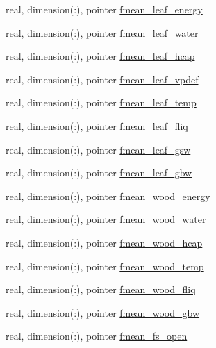 \begin{DoxyCompactItemize}
\item 
real, dimension(\+:), pointer \hyperlink{structed__state__vars_1_1edtype_a86d023e0719e25759958624fc4deab6a}{fmean\+\_\+leaf\+\_\+energy}
\item 
real, dimension(\+:), pointer \hyperlink{structed__state__vars_1_1edtype_ad010ecca9434d7086e8dcfbdaa4d3a26}{fmean\+\_\+leaf\+\_\+water}
\item 
real, dimension(\+:), pointer \hyperlink{structed__state__vars_1_1edtype_a08d40b6cd3d1b739b2ab23fb80eebb4b}{fmean\+\_\+leaf\+\_\+hcap}
\item 
real, dimension(\+:), pointer \hyperlink{structed__state__vars_1_1edtype_aa32570775165fe8ca61547c18eb6f1c7}{fmean\+\_\+leaf\+\_\+vpdef}
\item 
real, dimension(\+:), pointer \hyperlink{structed__state__vars_1_1edtype_a6879b6513cc08a7d32407853019ce04b}{fmean\+\_\+leaf\+\_\+temp}
\item 
real, dimension(\+:), pointer \hyperlink{structed__state__vars_1_1edtype_af9cd87c754e5fa443a97bf84d0688620}{fmean\+\_\+leaf\+\_\+fliq}
\item 
real, dimension(\+:), pointer \hyperlink{structed__state__vars_1_1edtype_a39cc8def6415f71910fd6d08cbe6b653}{fmean\+\_\+leaf\+\_\+gsw}
\item 
real, dimension(\+:), pointer \hyperlink{structed__state__vars_1_1edtype_aefa5130337b4c2a5d056000898f3129a}{fmean\+\_\+leaf\+\_\+gbw}
\item 
real, dimension(\+:), pointer \hyperlink{structed__state__vars_1_1edtype_a15d9cd9f08a7dfa71c0eace66cc45c7d}{fmean\+\_\+wood\+\_\+energy}
\item 
real, dimension(\+:), pointer \hyperlink{structed__state__vars_1_1edtype_a4ab09fc27f68f2abcb81de6b4cda3137}{fmean\+\_\+wood\+\_\+water}
\item 
real, dimension(\+:), pointer \hyperlink{structed__state__vars_1_1edtype_a800d4e284c279c8c0ed015d44d7c90b5}{fmean\+\_\+wood\+\_\+hcap}
\item 
real, dimension(\+:), pointer \hyperlink{structed__state__vars_1_1edtype_ab6227f537cd89edd48687fa6ecd12fdd}{fmean\+\_\+wood\+\_\+temp}
\item 
real, dimension(\+:), pointer \hyperlink{structed__state__vars_1_1edtype_a619260efe4d29e5b1e9d76fc7002d93d}{fmean\+\_\+wood\+\_\+fliq}
\item 
real, dimension(\+:), pointer \hyperlink{structed__state__vars_1_1edtype_a7cc8b35bc70fe8fbc634736630ac870d}{fmean\+\_\+wood\+\_\+gbw}
\item 
real, dimension(\+:), pointer \hyperlink{structed__state__vars_1_1edtype_a26dcd532a0aefbe2c38ed50aeec38c35}{fmean\+\_\+fs\+\_\+open}

\end{DoxyCompactItemize}
